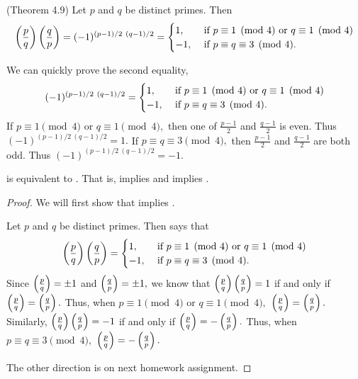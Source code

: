 \documentclass[letterpaper, 11 pt]{ximera}
\begin{document}
\begin{thm*}\label{quad-rec-standard-form} (Theorem 4.9)
	Let $p$ and $q$ be distinct primes.  Then
	\[
		\legendre{p}{q}\legendre{q}{p}=(-1)^{(p-1)/2\ (q-1)/2}=
			\begin{cases}
 				1, & \textnormal{ if } p\equiv 1\pmod{4} \textnormal{ or } q\equiv 1\pmod{4}\\
				-1, & \textnormal{ if } p\equiv q\equiv 3\pmod{4}.
			\end{cases}
	\]
\end{thm*}

\begin{remark}
	We can quickly prove the second equality, 
		\[(-1)^{(p-1)/2\ (q-1)/2}=
			\begin{cases}
 				1, & \textnormal{ if } p\equiv 1\pmod{4} \textnormal{ or } q\equiv 1\pmod{4}\\
				-1, & \textnormal{ if } p\equiv q\equiv 3\pmod{4}.
			\end{cases}\]
	If $p\equiv 1\pmod{4}$ or $q\equiv 1\pmod{4},$ then one of $\frac{p-1}{2}$ and $\frac{q-1}{2}$ is even. Thus $(-1)^{(p-1)/2\ (q-1)/2}=1.$ If $p\equiv q\equiv 3\pmod{4},$ then $\frac{p-1}{2}$ and $\frac{q-1}{2}$ are both odd. Thus $(-1)^{(p-1)/2\ (q-1)/2}=-1.$
\end{remark}

\begin{proposition}
  is equivalent to . That is,  implies  and  implies  .
\end{proposition}
\begin{proof}
	We will first show that  implies .
	
	Let $p$ and $q$ be distinct primes.  Then  says that 
	\[
		\left(\frac{p}{q}\right)\left(\frac{q}{p}\right)=
			\begin{cases}
 				1, & \textnormal{ if } p\equiv 1\pmod{4} \textnormal{ or } q\equiv 1\pmod{4}\\
				-1, & \textnormal{ if } p\equiv q\equiv 3\pmod{4}.
			\end{cases}
	\]
	Since $\left(\frac{p}{q}\right)=\pm 1$ and $\left(\frac{q}{p}\right)=\pm 1,$ we know that $\left(\frac{p}{q}\right)\left(\frac{q}{p}\right)=1$ if and only if $\left(\frac{p}{q}\right)=\left(\frac{q}{p}\right).$ Thus, when $p\equiv 1\pmod{4}$ or $q\equiv 1\pmod{4},$ $\left(\frac{p}{q}\right)=\left(\frac{q}{p}\right).$ Similarly, $\left(\frac{p}{q}\right)\left(\frac{q}{p}\right)=-1$ if and only if $\left(\frac{p}{q}\right)=-\left(\frac{q}{p}\right).$ Thus, when $p\equiv q\equiv 3\pmod{4},$ $\left(\frac{p}{q}\right)=-\left(\frac{q}{p}\right).$ 
	
	The other direction is on next homework assignment.
\end{proof}
\end{document}
